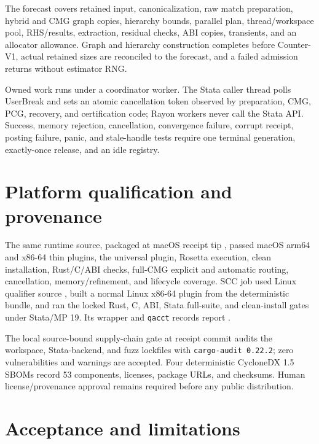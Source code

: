 \documentclass[10pt]{article}
\newcommand{\code}[1]{\texttt{#1}}
\begin{document}
The forecast covers retained input, canonicalization, raw match preparation,
hybrid and CMG graph copies, hierarchy bounds, parallel plan, thread/workspace
pool, RHS/results, extraction, residual checks, ABI copies, transients, and an
allocator allowance. Graph and hierarchy construction completes before
Counter-V1, actual retained sizes are reconciled to the forecast, and a failed
admission returns without estimator RNG.

Owned work runs under a coordinator worker. The Stata caller thread polls
UserBreak and sets an atomic cancellation token observed by preparation, CMG,
PCG, recovery, and certification code; Rayon workers never call the Stata API.
Success, memory rejection, cancellation, convergence failure, corrupt receipt,
posting failure, panic, and stale-handle tests require one terminal generation,
exactly-once release, and an idle registry.

\section{Platform qualification and provenance}

The same runtime source, packaged at macOS receipt tip
\texttt{\footnotesize\expandafter\seqsplit\expandafter{\MacQualificationCommit}},
passed macOS arm64 and x86-64 thin plugins, the universal plugin, Rosetta
execution, clean installation, Rust/C/ABI checks, full-CMG explicit and
automatic routing, cancellation, memory/refinement, and lifecycle coverage.
SCC job \SccQualifierJob{} used Linux qualifier source
\texttt{\footnotesize\expandafter\seqsplit\expandafter{\LinuxQualificationCommit}},
built a normal Linux x86-64 plugin from the deterministic bundle, and ran the
locked Rust, C, ABI, Stata full-suite, and clean-install gates under Stata/MP
19. Its wrapper and \code{qacct} records report \SccQualifierStatus.

The local source-bound supply-chain gate at receipt commit
\texttt{\SupplyShort{}} audits the workspace, Stata-backend, and fuzz lockfiles
with \code{cargo-audit 0.22.2}; zero vulnerabilities and warnings are accepted.
Four deterministic CycloneDX 1.5 SBOMs record 53 components, licenses, package
URLs, and checksums. Human license/provenance approval remains required before
any public distribution.

\section{Acceptance and limitations}
\end{document}
